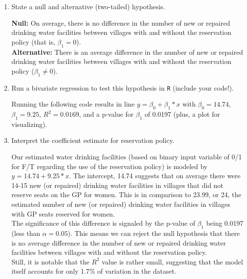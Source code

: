 \documentclass[12pt,letterpaper]{article}
\begin{document}
\newpage
\begin{enumerate}
	\item [(a)] State a null and alternative (two-tailed) hypothesis. \\
	\vspace{.2cm}
	
	\textbf{Null:} On average, there is no difference in the number of new or repaired drinking water facilities between villages with and without the reservation policy (that is, $\beta_{1} = 0$). \\
	\textbf{Alternative:} There is an average difference in the number of new or repaired drinking water facilities between villages with and without the reservation policy ($\beta_{1} \neq 0$).\\
	
	\vspace{.1cm}
	\item [(b)] Run a bivariate regression to test this hypothesis in \texttt{R} (include your code!).\\
	\vspace{.2cm}
	
	Running the following code results in line $y = \beta_{0} + \beta_{1}*x$ with $\beta_{0} = 14.74$, $\beta_{1} = 9.25$, $R^2 = 0.0169$, and a p-value for $\beta_{1}$ of 0.0197 (plus, a plot for visualizing).
		  
		
	\vspace{.1cm}
	\item [(c)] Interpret the coefficient estimate for reservation policy. \\
	\vspace{.2cm}
	
	Our estimated water drinking facilities (based on binary input variable of 0/1 for F/T regarding the use of the reservation policy) is modeled by $y = 14.74 + 9.25*x$. The intercept, 14.74 suggests that on average there were 14-15 new (or repaired) drinking water facilities in villages that did not reserve seats on the GP for women. This is in comparison to 23.99, or 24, the estimated number of new (or repaired) drinking water facilities in villages with GP seats reserved for women. \\
	
	The significance of this difference is signaled by the p-value of $\beta_{1}$ being 0.0197 (less than $\alpha = 0.05$). This means we can reject the null hypothesis that there is no average difference in the number of new or repaired drinking water facilities between villages with and without the reservation policy.\\
	
	Still, it is notable that the $R^2$ value is rather small, suggesting that the model itself accounts for only 1.7\% of variation in the dataset.\\

\end{enumerate}
\end{document}
